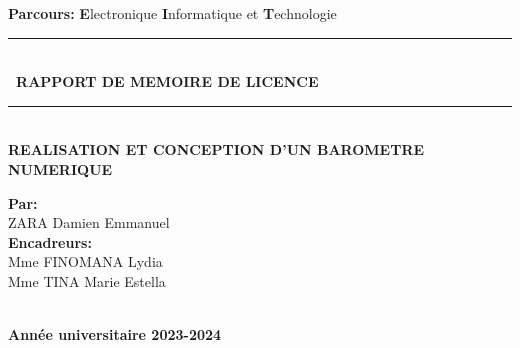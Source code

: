\documentclass[a4paper,12pt]{report}
\begin{document}
\begin{titlepage}
\begin{center}
\textsc{\Large}
{\large \bfseries Parcours: }
{\large \textbf{E}lectronique \textbf{I}nformatique et \textbf{T}echnologie }\\[1cm]




\rule{\linewidth}{0.2mm} \\[0.4cm]
{ \bfseries\ RAPPORT DE MEMOIRE DE LICENCE \\[0.1cm] }
\rule{\linewidth}{0.2mm} \\[3cm]



\textsc{\huge}
{\huge \bfseries\color{blue} REALISATION ET CONCEPTION D'UN BAROMETRE NUMERIQUE  \\[4cm] }



\begin{minipage}{0.8\textwidth}
  \begin{flushleft} \large
    \large \textbf{Par:}\\
    \setlength{\indent}
    \textsc{ZARA} Damien Emmanuel \\[1cm]
    \large \textbf{Encadreurs:}\\
   \setlength{\indent}   Mme FINOMANA Lydia \\
   \setlength{\indent}   Mme TINA Marie Estella \\
    	
  \end{flushleft}
\end{minipage}%
\begin{minipage}{0.8\textwidth}
  
\end{minipage}\\[1.8cm]



{\textbf{\large {Année universitaire} 2023-2024}}

\end{center}
\end{titlepage}

\null\newpage

 
 
\end{document}
